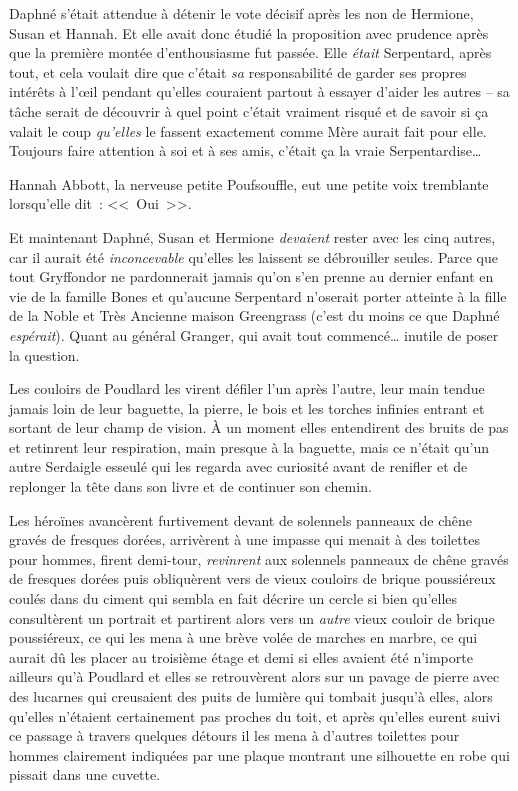 Daphné s'était attendue à détenir le vote décisif après les non de Hermione, Susan et Hannah. Et elle avait donc étudié la proposition avec prudence après que la première montée d'enthousiasme fut passée. Elle \emph{était} Serpentard, après tout, et cela voulait dire que c'était \emph{sa} responsabilité de garder ses propres intérêts à l'œil pendant qu'elles couraient partout à essayer d'aider les autres -- sa tâche serait de découvrir à quel point c'était vraiment risqué et de savoir si ça valait le coup \emph{qu'elles} le fassent exactement comme Mère aurait fait pour elle. Toujours faire attention à soi et à ses amis, c'était ça la vraie Serpentardise…

Hannah Abbott, la nerveuse petite Poufsouffle, eut une petite voix tremblante lorsqu'elle dit~: <<~Oui~>>.

Et maintenant Daphné, Susan et Hermione \emph{devaient} rester avec les cinq autres, car il aurait été \emph{inconcevable} qu'elles les laissent se débrouiller seules. Parce que tout Gryffondor ne pardonnerait jamais qu'on s'en prenne au dernier enfant en vie de la famille Bones et qu'aucune Serpentard n'oserait porter atteinte à la fille de la Noble et Très Ancienne maison Greengrass (c'est du moins ce que Daphné \emph{espérait}). Quant au général Granger, qui avait tout commencé… inutile de poser la question.

Les couloirs de Poudlard les virent défiler l'un après l'autre, leur main tendue jamais loin de leur baguette, la pierre, le bois et les torches infinies entrant et sortant de leur champ de vision. À un moment elles entendirent des bruits de pas et retinrent leur respiration, main presque à la baguette, mais ce n'était qu'un autre Serdaigle esseulé qui les regarda avec curiosité avant de renifler et de replonger la tête dans son livre et de continuer son chemin.

Les héroïnes avancèrent furtivement devant de solennels panneaux de chêne gravés de fresques dorées, arrivèrent à une impasse qui menait à des toilettes pour hommes, firent demi-tour, \emph{revinrent} aux solennels panneaux de chêne gravés de fresques dorées puis obliquèrent vers de vieux couloirs de brique poussiéreux coulés dans du ciment qui sembla en fait décrire un cercle si bien qu'elles consultèrent un portrait et partirent alors vers un \emph{autre} vieux couloir de brique poussiéreux, ce qui les mena à une brève volée de marches en marbre, ce qui aurait dû les placer au troisième étage et demi si elles avaient été n'importe ailleurs qu'à Poudlard et elles se retrouvèrent alors sur un pavage de pierre avec des lucarnes qui creusaient des puits de lumière qui tombait jusqu'à elles, alors qu'elles n'étaient certainement pas proches du toit, et après qu'elles eurent suivi ce passage à travers quelques détours il les mena à d'autres toilettes pour hommes clairement indiquées par une plaque montrant une silhouette en robe qui pissait dans une cuvette.

